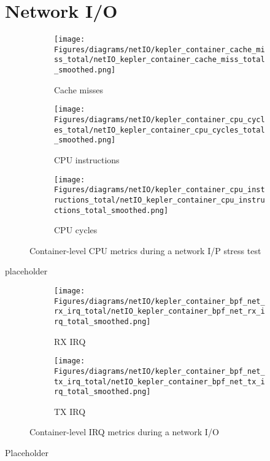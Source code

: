 \section{Network I/O}

\begin{figure}[H]
    \centering
    \begin{subfigure}{1\textwidth}
        \texttt{[image: Figures/diagrams/netIO/kepler\_container\_cache\_miss\_total/netIO\_kepler\_container\_cache\_miss\_total\_smoothed.png]}
        \caption{Cache misses}
    \end{subfigure}
    \begin{subfigure}{0.49\textwidth}
        \texttt{[image: Figures/diagrams/netIO/kepler\_container\_cpu\_cycles\_total/netIO\_kepler\_container\_cpu\_cycles\_total\_smoothed.png]}
        \caption{CPU instructions}
    \end{subfigure}
    \begin{subfigure}{0.49\textwidth}
        \texttt{[image: Figures/diagrams/netIO/kepler\_container\_cpu\_instructions\_total/netIO\_kepler\_container\_cpu\_instructions\_total\_smoothed.png]}
        \caption{CPU cycles}
    \end{subfigure}
    \caption{Container-level CPU metrics during a network I/P stress test}
\end{figure}

placeholder

\begin{figure}[H]
    \centering
    \begin{subfigure}{0.49\textwidth}
        \texttt{[image: Figures/diagrams/netIO/kepler\_container\_bpf\_net\_rx\_irq\_total/netIO\_kepler\_container\_bpf\_net\_rx\_irq\_total\_smoothed.png]}
        \caption{RX IRQ}
    \end{subfigure}
    \begin{subfigure}{0.49\textwidth}
        \texttt{[image: Figures/diagrams/netIO/kepler\_container\_bpf\_net\_tx\_irq\_total/netIO\_kepler\_container\_bpf\_net\_tx\_irq\_total\_smoothed.png]}
        \caption{TX IRQ}
    \end{subfigure}
    \caption{Container-level IRQ metrics during a network I/O}
\end{figure}

Placeholder
